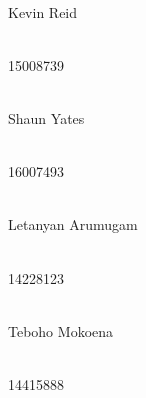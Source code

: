\documentclass[12pt]{article}
\begin{document}
\begin{titlepage}
\begin{center}
		\begin{minipage}{0.4\textwidth}
			\begin{flushleft} \large
				\emph{} \\
				Kevin Reid
			\end{flushleft}
		\end{minipage}
		\begin{minipage}{0.4\textwidth}
			\begin{flushright} \large
				\emph{} \\
				15008739
			\end{flushright}
		\end{minipage}

		\begin{minipage}{0.4\textwidth}
			\begin{flushleft} \large
				\emph{} \\
				Shaun {Yates}
			\end{flushleft}
		\end{minipage}
		\begin{minipage}{0.4\textwidth}
			\begin{flushright} \large
				\emph{} \\
				16007493
			\end{flushright}
		\end{minipage}
        
        \begin{minipage}{0.4\textwidth}
			\begin{flushleft} \large
				\emph{} \\
				Letanyan {Arumugam}
			\end{flushleft}
		\end{minipage}
		\begin{minipage}{0.4\textwidth}
			\begin{flushright} \large
				\emph{} \\
				14228123 
			\end{flushright}
		\end{minipage}
		
		\begin{minipage}{0.4\textwidth}
			\begin{flushleft} \large
				\emph{} \\
				Teboho {Mokoena}
			\end{flushleft}
		\end{minipage}
		\begin{minipage}{0.4\textwidth}
			\begin{flushright} \large
				\emph{} \\
				14415888 
			\end{flushright}
		\end{minipage}
		\break
		\break
		

\end{center}
\end{titlepage}
\end{document}
